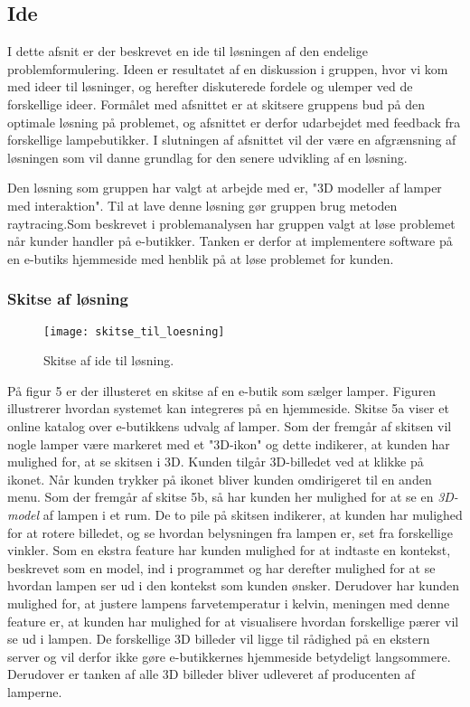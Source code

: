\subsection{Ide}

I dette afsnit er der beskrevet en ide til løsningen af den endelige problemformulering. Ideen er resultatet af en diskussion i gruppen, hvor vi kom med ideer til løsninger, og herefter diskuterede fordele og ulemper ved de forskellige ideer. Formålet med afsnittet er at skitsere gruppens bud på den optimale løsning på problemet, og afsnittet er derfor udarbejdet med feedback fra forskellige lampebutikker. I slutningen af afsnittet vil der være en afgrænsning af løsningen som vil danne grundlag for den senere udvikling af en løsning.

Den løsning som gruppen har valgt at arbejde med er, "3D modeller af lamper med interaktion". Til at lave denne løsning gør gruppen brug metoden raytracing.\newline Som beskrevet i problemanalysen har gruppen valgt at løse problemet når kunder handler på e-butikker. Tanken er derfor at implementere software på en e-butiks hjemmeside med henblik på at løse problemet for kunden.

\subsubsection{Skitse af løsning}

\begin{figure}[H]
   \centering
   \texttt{[image: skitse\_til\_loesning]}
   \caption{Skitse af ide til løsning.}
\end{figure}

På figur 5 er der illusteret en skitse af en e-butik som sælger lamper. Figuren illustrerer hvordan systemet kan integreres på en hjemmeside. Skitse 5a viser et online katalog over e-butikkens udvalg af lamper. Som der fremgår af skitsen vil nogle lamper være markeret med et "3D-ikon" og dette indikerer, at kunden har mulighed for, at se skitsen i 3D. Kunden tilgår 3D-billedet ved at klikke på ikonet. Når kunden trykker på ikonet bliver kunden omdirigeret til en anden menu. Som der fremgår af skitse 5b, så har kunden her mulighed for at se en \textit{3D-model} af lampen i et rum. De to pile på skitsen indikerer, at kunden har mulighed for at rotere billedet, og se hvordan belysningen fra lampen er, set fra forskellige vinkler. Som en ekstra feature har kunden mulighed for at indtaste en kontekst, beskrevet som en model, ind i programmet og har derefter mulighed for at se hvordan lampen ser ud i den kontekst som kunden ønsker. 
Derudover har kunden mulighed for, at justere lampens farvetemperatur i kelvin, meningen med denne feature er, at kunden har mulighed for at visualisere hvordan forskellige pærer vil se ud i lampen. De forskellige 3D billeder vil ligge til rådighed på en ekstern server og vil derfor ikke gøre e-butikkernes hjemmeside betydeligt langsommere. Derudover er tanken af alle 3D billeder bliver udleveret af producenten af lamperne. 

